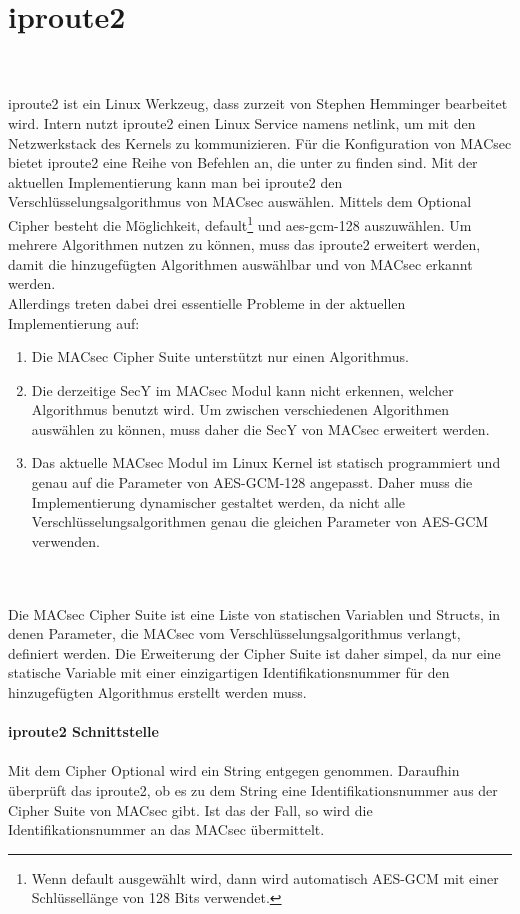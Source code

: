 \section{iproute2}
\\
\\
iproute2 ist ein Linux Werkzeug, dass zurzeit von Stephen Hemminger bearbeitet wird. Intern nutzt iproute2 einen Linux Service namens netlink, um mit den Netzwerkstack des Kernels zu kommunizieren. Für die Konfiguration von MACsec bietet iproute2 eine Reihe von Befehlen an, die unter \cite{Manpage} zu finden sind. Mit der aktuellen Implementierung kann man bei iproute2 den Verschlüsselungsalgorithmus von \gls{MACsec} auswählen. Mittels dem Optional Cipher besteht die Möglichkeit, \glqq default\footnote[18]{Wenn default ausgewählt wird, dann wird automatisch \gls{AES-GCM} mit einer Schlüssellänge von 128 Bits verwendet.}\grqq{} und \glqq aes-gcm-128\grqq{} auszuwählen. Um mehrere Algorithmen nutzen zu können, muss das iproute2 erweitert werden, damit die hinzugefügten Algorithmen auswählbar und von MACsec erkannt werden.\\ Allerdings treten dabei drei essentielle Probleme in der aktuellen Implementierung auf:
\begin{enumerate}
\item Die MACsec Cipher Suite unterstützt nur einen Algorithmus. 
\item Die derzeitige \gls{SecY} im \gls{MACsec} Modul kann nicht erkennen, welcher Algorithmus benutzt wird. Um zwischen verschiedenen Algorithmen auswählen zu können, muss daher die SecY von MACsec erweitert werden.
\item Das aktuelle MACsec Modul im Linux Kernel ist  statisch programmiert und genau auf die Parameter von AES-GCM-128 angepasst. Daher muss die Implementierung dynamischer gestaltet werden, da nicht alle Verschlüsselungsalgorithmen genau die gleichen Parameter von \gls{AES-GCM} verwenden.
\end{enumerate}\\
\\
Die \gls{MACsec} Cipher Suite ist eine Liste von statischen Variablen und Structs, in denen Parameter, die MACsec vom Verschlüsselungsalgorithmus verlangt, definiert werden.
Die Erweiterung der Cipher Suite ist daher simpel, da nur eine statische Variable mit einer einzigartigen Identifikationsnummer für den hinzugefügten Algorithmus erstellt werden muss.\\
\\
\textbf{iproute2 Schnittstelle}\\
\\
Mit dem Cipher Optional wird ein String entgegen genommen. Daraufhin überprüft das iproute2, ob es zu dem String eine Identifikationsnummer aus der Cipher Suite von MACsec gibt. Ist das der Fall, so wird die Identifikationsnummer an das \gls{MACsec} übermittelt. 
